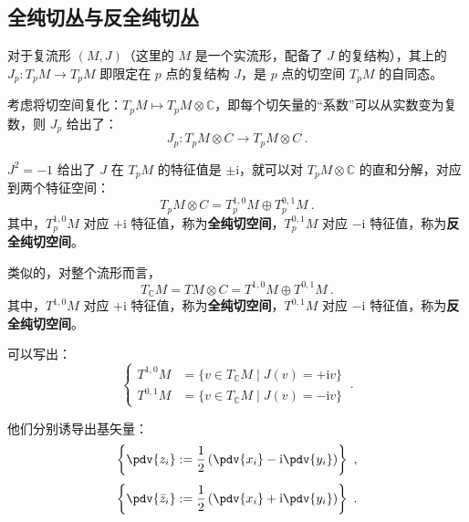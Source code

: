 

\subsection{全纯切丛与反全纯切丛}
对于复流形 $(M, J)$（这里的 $M$ 是一个实流形，配备了 $J$ 的复结构），其上的 $J_p: T_p M \to T_p M$ 即限定在 $p$ 点的复结构 $J$，是 $p$ 点的切空间 $T_p M$ 的自同态。

考虑将切空间复化：$T_p M \mapsto T_p M \otimes \mathbb C$，即每个切矢量的“系数”可以从实数变为复数，则 $J_p$ 给出了：
\begin{equation}
J_p : T_p M \otimes C \to T_p M \otimes C ~.
\end{equation}

$J^2 = -1$ 给出了 $J$ 在 $T_p M$ 的特征值是 $\pm \mathrm i$，就可以对 $T_p M \otimes \mathbb C$ 的直和分解，对应到两个特征空间：
\begin{equation}
T_p M \otimes C = T_p^{1, 0} M \oplus T_p^{0, 1} M ~.
\end{equation}
其中，$T_p^{1, 0} M$ 对应 $+\mathrm i$ 特征值，称为\textbf{全纯切空间}，$T_p^{0, 1} M$ 对应 $-\mathrm i$ 特征值，称为\textbf{反全纯切空间}。


类似的，对整个流形而言，
\begin{equation}
T_{\mathbb C} M = TM \otimes C = T^{1, 0} M \oplus T^{0, 1} M ~.
\end{equation}
其中，$T^{1, 0} M$ 对应 $+\mathrm i$ 特征值，称为\textbf{全纯切空间}，$T^{0, 1} M$ 对应 $-\mathrm i$ 特征值，称为\textbf{反全纯切空间}。

可以写出：
\begin{equation}
\left\{\begin{aligned}
T^{1, 0} M &= \{v \in T_{\mathbb C} M \mid J(v) = +\mathrm i v\} \\
T^{0, 1} M &= \{v \in T_{\mathbb C} M \mid J(v) = -\mathrm i v\} 
\end{aligned}\right. ~.
\end{equation}

他们分别诱导出基矢量：
\begin{equation}
\left\{ \pdv{z_i} := \frac{1}{2} \left( \pdv{x_i} - \mathrm i \pdv{y_i} \right) \right\} ~,
\end{equation}
\begin{equation} 
\left\{ \pdv{\bar z_i} := \frac{1}{2} \left( \pdv{x_i} + \mathrm i \pdv{y_i} \right)\right\} ~.
\end{equation}

